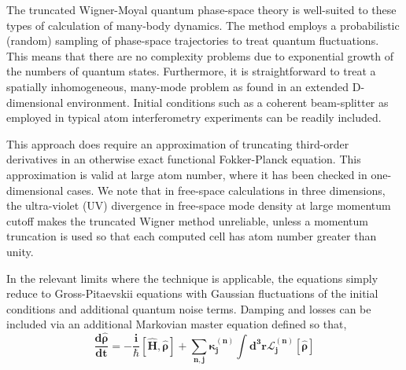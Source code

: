 \documentclass[aps,prl,twocolumn,showpacs,amsmath,amssymb,superscriptaddress]{revtex4-1}
\begin{document}
The truncated Wigner-Moyal quantum phase-space theory is well-suited
to these types of calculation of many-body dynamics.
The method employs a probabilistic (random) sampling of phase-space trajectories
to treat quantum fluctuations.
This means that there are no complexity problems due to exponential growth
of the numbers of quantum states.
Furthermore, it is straightforward to treat a spatially inhomogeneous,
many-mode problem as found in an extended D-dimensional environment.
Initial conditions such as a coherent beam-splitter
as employed in typical atom interferometry experiments can be readily included.

This approach does require an approximation of truncating third-order derivatives
in an otherwise exact functional Fokker-Planck equation.
This approximation is valid at large atom number,
where it has been checked in one-dimensional cases.
We note that in free-space calculations in three dimensions,
the ultra-violet (UV) divergence in free-space mode density at large momentum cutoff
makes the truncated Wigner method unreliable,
unless a momentum truncation is used so that each computed cell has atom number greater than unity.

In the relevant limits where the technique is applicable,
the equations simply reduce to Gross-Pitaevskii equations with Gaussian fluctuations
of the initial conditions and additional quantum noise terms.
Damping and losses can be included via an additional Markovian master equation defined so that,
\begin{equation}
\bm{
	\frac{d\hat{\rho}}{dt} = -\frac{i}{\hbar} \left[ \hat{H}, \hat{\rho} \right] +
	\sum_{n,\mathbf{j}} \kappa_{\mathbf{j}}^{(n)}
	\int d^{3}\mathbf{r}\mathcal{L}_{\mathbf{j}}^{(n)} \left[ \hat{\rho} \right]
}
\end{equation}
\end{document}
